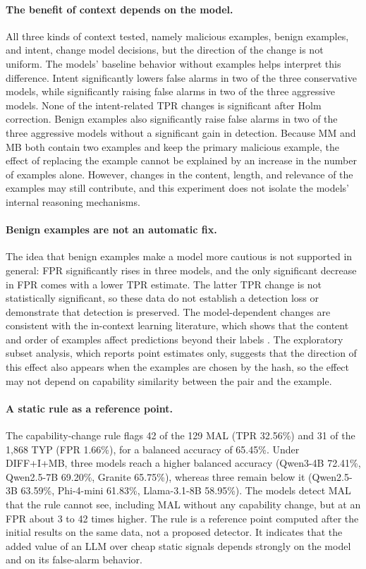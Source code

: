 \documentclass[a4paper,fleqn]{cas-dc}
\begin{document}
\paragraph{The benefit of context depends on the model.}
All three kinds of context tested, namely malicious examples, benign examples, and
intent, change model decisions, but the direction of the change is not uniform.
The models' baseline behavior without examples helps interpret this difference.
Intent significantly lowers false alarms in two of the three conservative
models, while significantly raising false alarms in two of the three
aggressive models. None of the intent-related TPR changes is significant
after Holm correction. Benign examples also significantly raise false alarms
in two of the three aggressive models without a significant gain in detection.
Because MM and MB both contain two examples and keep the primary
malicious example, the effect of replacing the example cannot be explained by an
increase in the number of examples alone. However, changes in the content, length,
and relevance of the examples may still contribute, and this experiment does not
isolate the models' internal reasoning mechanisms.

\paragraph{Benign examples are not an automatic fix.}
The idea that benign examples make a model more cautious is not supported in
general: FPR significantly rises in three models, and the only significant
decrease in FPR comes with a lower TPR estimate. The latter TPR change is not
statistically significant, so these data do not establish a detection loss or
demonstrate that detection is preserved. The model-dependent changes are consistent with the
in-context learning literature, which shows that the content and order of
examples affect predictions beyond their labels
\citep{min2022rethinking,zhao2021calibrate}. The exploratory subset analysis, which reports point estimates only, suggests that the direction of this effect also appears when the examples are chosen by the hash, so the effect may not depend on capability similarity between the pair and the example.

\paragraph{A static rule as a reference point.}
The capability-change rule flags 42 of the 129 MAL (TPR 32.56\%) and 31 of the
1,868 TYP (FPR 1.66\%), for a balanced accuracy of 65.45\%. Under DIFF+I+MB,
three models reach a higher balanced accuracy (Qwen3-4B 72.41\%, Qwen2.5-7B
69.20\%, Granite 65.75\%), whereas three remain below it (Qwen2.5-3B 63.59\%,
Phi-4-mini 61.83\%, Llama-3.1-8B 58.95\%). The models detect MAL that the rule
cannot see, including MAL without any capability change, but at an FPR about 3 to
42 times higher. The rule is a reference point computed after the initial results
on the same data, not a proposed detector. It indicates that the added value of an
LLM over cheap static signals depends strongly on the model and on its
false-alarm behavior.
\end{document}

